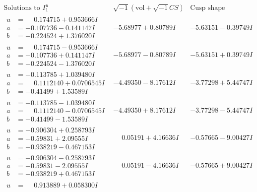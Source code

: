 \documentclass[1p]{elsarticle_modified}
\theoremstyle{definition}
\newcommand{\I}{\sqrt{-1}}
\begin{document}
$$\begin{array}{c|c|c}  
\text{Solutions to }I^u_{1}& \I (\text{vol} + \sqrt{-1}CS) & \text{Cusp shape}\\
 \hline 
\begin{aligned}
u &= \phantom{-}0.174715 + 0.953666 I \\
a &= -0.107736 - 0.141147 I \\
b &= -0.224524 + 1.376020 I\end{aligned}
 & -5.68977 + 0.80789 I & -5.63151 - 0.39749 I \\ \hline\begin{aligned}
u &= \phantom{-}0.174715 - 0.953666 I \\
a &= -0.107736 + 0.141147 I \\
b &= -0.224524 - 1.376020 I\end{aligned}
 & -5.68977 - 0.80789 I & -5.63151 + 0.39749 I \\ \hline\begin{aligned}
u &= -0.113785 + 1.039480 I \\
a &= \phantom{-}0.1112140 + 0.0706545 I \\
b &= -0.41499 + 1.53589 I\end{aligned}
 & -4.49350 - 8.17612 I & -3.77298 + 5.44747 I \\ \hline\begin{aligned}
u &= -0.113785 - 1.039480 I \\
a &= \phantom{-}0.1112140 - 0.0706545 I \\
b &= -0.41499 - 1.53589 I\end{aligned}
 & -4.49350 + 8.17612 I & -3.77298 - 5.44747 I \\ \hline\begin{aligned}
u &= -0.906304 + 0.258793 I \\
a &= -0.59831 + 2.09555 I \\
b &= -0.938219 - 0.467153 I\end{aligned}
 & \phantom{-}0.05191 + 4.16636 I & -0.57665 - 9.00427 I \\ \hline\begin{aligned}
u &= -0.906304 - 0.258793 I \\
a &= -0.59831 - 2.09555 I \\
b &= -0.938219 + 0.467153 I\end{aligned}
 & \phantom{-}0.05191 - 4.16636 I & -0.57665 + 9.00427 I \\ \hline\begin{aligned}
u &= \phantom{-}0.913889 + 0.058300 I \\

\end{aligned}
\end{array}$$
\end{document}
